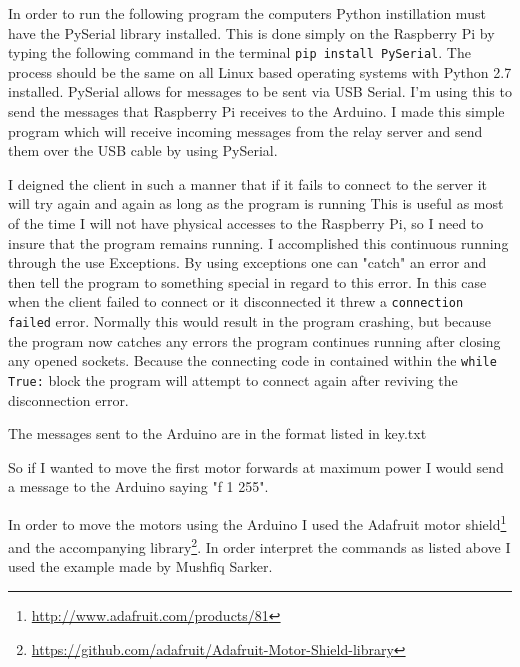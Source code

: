 \documentclass[]{report}   %
\begin{document}
						In order to run the following program the computers Python instillation must have the PySerial library installed. This is done simply on
						the Raspberry Pi by typing the following command in the terminal \lstinline{pip install PySerial}. The process should be the same on all
						Linux based operating systems with Python 2.7 installed. PySerial allows for messages to be sent via USB Serial. I'm using this to send
						the messages that Raspberry Pi receives to the Arduino. I made this simple program which will receive incoming messages from the relay
						server and send them over the USB cable by using PySerial.
						
						
						I deigned the client in such a manner that if it fails to connect to the server it will try again and again as long as the program is running
						This is useful as most of the time I will not have physical accesses to the Raspberry Pi, so I need to insure that the program remains running.
						I accomplished this continuous running through the use Exceptions. By using exceptions one can "catch" an error and then tell the program to
						something special in regard to this error. In this case when the client failed to connect or it disconnected it threw a
						\lstinline{connection failed} error. Normally this would result in the program crashing, but because the program now catches any errors the program
						continues running after closing any opened sockets. Because the connecting code in contained within the \lstinline{while True:} block the program will
						attempt to connect again after reviving the disconnection error.
						
						The messages sent to the Arduino are in the format listed in key.txt
						
						
						So if I wanted to move the first motor forwards at maximum power I would send a message to the Arduino saying "f 1 255".
						
						In order to move the motors using the Arduino I used the Adafruit motor shield\footnote{\url{http://www.adafruit.com/products/81}} and the
						accompanying library\footnote{\url{https://github.com/adafruit/Adafruit-Motor-Shield-library}}. In order interpret the commands as listed
						above I used the example made by Mushfiq Sarker\cite{serialread}.
						
						
\end{document}
